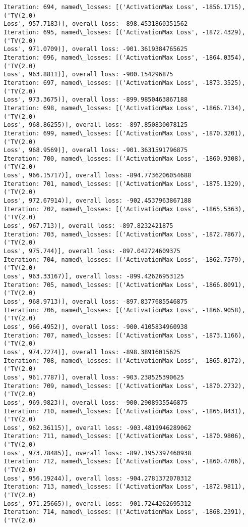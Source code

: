 \documentclass[10pt]{article}
\begin{document}
\begin{Verbatim}[commandchars=\\\{\}]
Iteration: 694, named\_losses: [('ActivationMax Loss', -1856.1715), ('TV(2.0)
Loss', 957.7183)], overall loss: -898.4531860351562
Iteration: 695, named\_losses: [('ActivationMax Loss', -1872.4329), ('TV(2.0)
Loss', 971.0709)], overall loss: -901.3619384765625
Iteration: 696, named\_losses: [('ActivationMax Loss', -1864.0354), ('TV(2.0)
Loss', 963.8811)], overall loss: -900.154296875
Iteration: 697, named\_losses: [('ActivationMax Loss', -1873.3525), ('TV(2.0)
Loss', 973.3675)], overall loss: -899.9850463867188
Iteration: 698, named\_losses: [('ActivationMax Loss', -1866.7134), ('TV(2.0)
Loss', 968.86255)], overall loss: -897.850830078125
Iteration: 699, named\_losses: [('ActivationMax Loss', -1870.3201), ('TV(2.0)
Loss', 968.9569)], overall loss: -901.3631591796875
Iteration: 700, named\_losses: [('ActivationMax Loss', -1860.9308), ('TV(2.0)
Loss', 966.15717)], overall loss: -894.7736206054688
Iteration: 701, named\_losses: [('ActivationMax Loss', -1875.1329), ('TV(2.0)
Loss', 972.67914)], overall loss: -902.4537963867188
Iteration: 702, named\_losses: [('ActivationMax Loss', -1865.5363), ('TV(2.0)
Loss', 967.713)], overall loss: -897.8232421875
Iteration: 703, named\_losses: [('ActivationMax Loss', -1872.7867), ('TV(2.0)
Loss', 975.744)], overall loss: -897.042724609375
Iteration: 704, named\_losses: [('ActivationMax Loss', -1862.7579), ('TV(2.0)
Loss', 963.33167)], overall loss: -899.42626953125
Iteration: 705, named\_losses: [('ActivationMax Loss', -1866.8091), ('TV(2.0)
Loss', 968.9713)], overall loss: -897.8377685546875
Iteration: 706, named\_losses: [('ActivationMax Loss', -1866.9058), ('TV(2.0)
Loss', 966.4952)], overall loss: -900.4105834960938
Iteration: 707, named\_losses: [('ActivationMax Loss', -1873.1166), ('TV(2.0)
Loss', 974.7274)], overall loss: -898.38916015625
Iteration: 708, named\_losses: [('ActivationMax Loss', -1865.0172), ('TV(2.0)
Loss', 961.7787)], overall loss: -903.238525390625
Iteration: 709, named\_losses: [('ActivationMax Loss', -1870.2732), ('TV(2.0)
Loss', 969.9823)], overall loss: -900.2908935546875
Iteration: 710, named\_losses: [('ActivationMax Loss', -1865.8431), ('TV(2.0)
Loss', 962.36115)], overall loss: -903.4819946289062
Iteration: 711, named\_losses: [('ActivationMax Loss', -1870.9806), ('TV(2.0)
Loss', 973.78485)], overall loss: -897.1957397460938
Iteration: 712, named\_losses: [('ActivationMax Loss', -1860.4706), ('TV(2.0)
Loss', 956.19244)], overall loss: -904.2781372070312
Iteration: 713, named\_losses: [('ActivationMax Loss', -1872.9811), ('TV(2.0)
Loss', 971.25665)], overall loss: -901.7244262695312
Iteration: 714, named\_losses: [('ActivationMax Loss', -1868.2391), ('TV(2.0)

\end{Verbatim}
\end{document}
